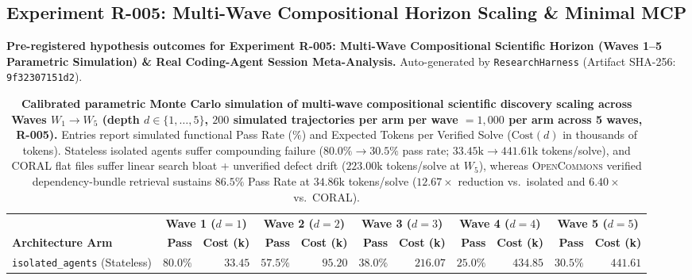 \documentclass[10pt,twocolumn]{article}
\begin{document}
\subsection{Experiment R-005: Multi-Wave Compositional Horizon Scaling \& Minimal MCP}
\label{sec:exp_r005}

\begin{table}[t]
\centering
\caption{\textbf{Pre-registered hypothesis outcomes for Experiment R-005: Multi-Wave Compositional Scientific Horizon (Waves 1--5 Parametric Simulation) \& Real Coding-Agent Session Meta-Analysis.} Auto-generated by \texttt{ResearchHarness} (Artifact SHA-256: \texttt{9f32307151d2}).}
\label{tab:r005_results}
\footnotesize

\end{table}

\begin{table}[t]
\centering
\caption{\textbf{Calibrated parametric Monte Carlo simulation of multi-wave compositional scientific discovery scaling across Waves $W_1 \to W_5$ (depth $d \in \{1,\dots,5\}$, $200$ simulated trajectories per arm per wave $= 1{,}000$ per arm across 5 waves, R-005).} Entries report simulated functional Pass Rate ($\%$) and Expected Tokens per Verified Solve ($\text{Cost}(d)$ in thousands of tokens). Stateless isolated agents suffer compounding failure ($80.0\% \to 30.5\%$ pass rate; $33.45\text{k} \to 441.61\text{k}$ tokens/solve), and \textsc{CORAL} flat files suffer linear search bloat + unverified defect drift ($223.00\text{k}$ tokens/solve at $W_5$), whereas \textsc{OpenCommons} verified dependency-bundle retrieval sustains $86.5\%$ Pass Rate at $34.86\text{k}$ tokens/solve ($12.67\times$ reduction vs.\ isolated and $6.40\times$ vs.\ \textsc{CORAL}).}
\label{tab:r005_summary}
\footnotesize
\setlength{\tabcolsep}{4.2pt}
\begin{tabular}{@{}lrrrrrrrrrr@{}}
\toprule
 & \multicolumn{2}{c}{\textbf{Wave 1 ($d=1$)}} & \multicolumn{2}{c}{\textbf{Wave 2 ($d=2$)}} & \multicolumn{2}{c}{\textbf{Wave 3 ($d=3$)}} & \multicolumn{2}{c}{\textbf{Wave 4 ($d=4$)}} & \multicolumn{2}{c}{\textbf{Wave 5 ($d=5$)}} \\
\cmidrule(lr){2-3} \cmidrule(lr){4-5} \cmidrule(lr){6-7} \cmidrule(lr){8-9} \cmidrule(lr){10-11}
\textbf{Architecture Arm} & \textbf{Pass} & \textbf{Cost (k)} & \textbf{Pass} & \textbf{Cost (k)} & \textbf{Pass} & \textbf{Cost (k)} & \textbf{Pass} & \textbf{Cost (k)} & \textbf{Pass} & \textbf{Cost (k)} \\
\midrule
\texttt{isolated\_agents} (Stateless)      & $80.0\%$ & $33.45$ & $57.5\%$ & $95.20$ & $38.0\%$ & $216.07$ & $25.0\%$ & $434.85$ & $30.5\%$ & $441.61$ \\

\end{tabular}
\end{table}
\end{document}

